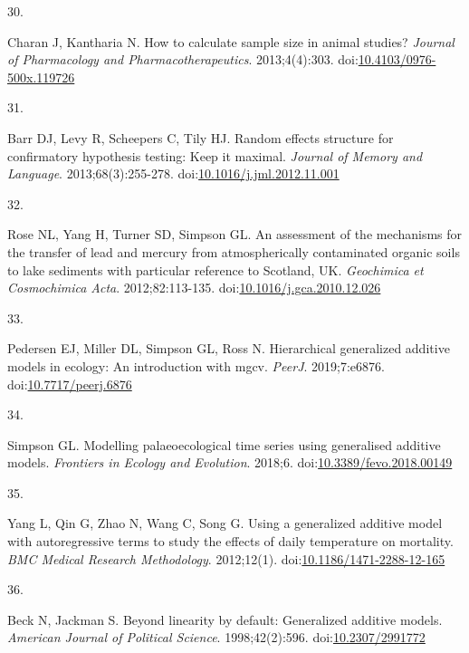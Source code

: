 \documentclass[
]{article}
\newlength{\cslhangindent}
\newlength{\csllabelwidth}
\newlength{\cslentryspacingunit} %
\newenvironment{CSLReferences}[2] %
 {%
  \setlength{\parindent}{0pt}
  \ifodd #1
  \let\oldpar\par
  \def\par{\hangindent=\cslhangindent\oldpar}
  \fi
  \setlength{\parskip}{#2\cslentryspacingunit}
 }%
 {}
\newcommand{\CSLLeftMargin}[1]{\parbox[t]{\csllabelwidth}{#1}}
\newcommand{\CSLRightInline}[1]{\parbox[t]{\linewidth - \csllabelwidth}{#1}\break}
\begin{document}
\begin{CSLReferences}{0}{0}
\leavevmode{}%
\CSLLeftMargin{30. }
\CSLRightInline{Charan J, Kantharia N. How to calculate sample size in animal studies? \emph{Journal of Pharmacology and Pharmacotherapeutics}. 2013;4(4):303. doi:\href{https://doi.org/10.4103/0976-500x.119726}{10.4103/0976-500x.119726}}

\leavevmode{}%
\CSLLeftMargin{31. }
\CSLRightInline{Barr DJ, Levy R, Scheepers C, Tily HJ. Random effects structure for confirmatory hypothesis testing: Keep it maximal. \emph{Journal of Memory and Language}. 2013;68(3):255-278. doi:\href{https://doi.org/10.1016/j.jml.2012.11.001}{10.1016/j.jml.2012.11.001}}

\leavevmode{}%
\CSLLeftMargin{32. }
\CSLRightInline{Rose NL, Yang H, Turner SD, Simpson GL. An assessment of the mechanisms for the transfer of lead and mercury from atmospherically contaminated organic soils to lake sediments with particular reference to {S}cotland, {UK}. \emph{Geochimica et Cosmochimica Acta}. 2012;82:113-135. doi:\href{https://doi.org/10.1016/j.gca.2010.12.026}{10.1016/j.gca.2010.12.026}}

\leavevmode{}%
\CSLLeftMargin{33. }
\CSLRightInline{Pedersen EJ, Miller DL, Simpson GL, Ross N. Hierarchical generalized additive models in ecology: An introduction with mgcv. \emph{{PeerJ}}. 2019;7:e6876. doi:\href{https://doi.org/10.7717/peerj.6876}{10.7717/peerj.6876}}

\leavevmode{}%
\CSLLeftMargin{34. }
\CSLRightInline{Simpson GL. Modelling palaeoecological time series using generalised additive models. \emph{Frontiers in Ecology and Evolution}. 2018;6. doi:\href{https://doi.org/10.3389/fevo.2018.00149}{10.3389/fevo.2018.00149}}

\leavevmode{}%
\CSLLeftMargin{35. }
\CSLRightInline{Yang L, Qin G, Zhao N, Wang C, Song G. Using a generalized additive model with autoregressive terms to study the effects of daily temperature on mortality. \emph{{BMC} Medical Research Methodology}. 2012;12(1). doi:\href{https://doi.org/10.1186/1471-2288-12-165}{10.1186/1471-2288-12-165}}

\leavevmode{}%
\CSLLeftMargin{36. }
\CSLRightInline{Beck N, Jackman S. Beyond linearity by default: Generalized additive models. \emph{American Journal of Political Science}. 1998;42(2):596. doi:\href{https://doi.org/10.2307/2991772}{10.2307/2991772}}


\end{CSLReferences}
\end{document}
